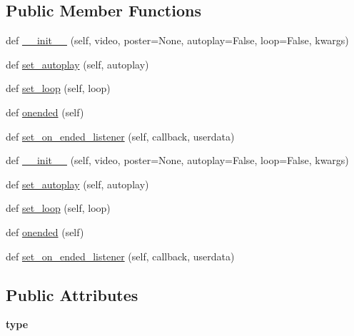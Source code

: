 \subsection*{Public Member Functions}
\begin{DoxyCompactItemize}
\item 
def \hyperlink{classremi_1_1gui_1_1VideoPlayer_a8774671509c23743defcfbf562bbb946}{\+\_\+\+\_\+init\+\_\+\+\_\+} (self, video, poster=None, autoplay=False, loop=False, kwargs)
\item 
def \hyperlink{classremi_1_1gui_1_1VideoPlayer_a762d544c9a502dd9988088ff9341f2aa}{set\+\_\+autoplay} (self, autoplay)
\item 
def \hyperlink{classremi_1_1gui_1_1VideoPlayer_a3c966cee519207e07a5c5dad6883d2c7}{set\+\_\+loop} (self, loop)
\item 
def \hyperlink{classremi_1_1gui_1_1VideoPlayer_a81838f6a1674b811c6d6f28ea59ff766}{onended} (self)
\item 
def \hyperlink{classremi_1_1gui_1_1VideoPlayer_a3da4aff9229c56332ec04663d539ad3b}{set\+\_\+on\+\_\+ended\+\_\+listener} (self, callback, userdata)
\item 
def \hyperlink{classremi_1_1gui_1_1VideoPlayer_a8774671509c23743defcfbf562bbb946}{\+\_\+\+\_\+init\+\_\+\+\_\+} (self, video, poster=None, autoplay=False, loop=False, kwargs)
\item 
def \hyperlink{classremi_1_1gui_1_1VideoPlayer_a762d544c9a502dd9988088ff9341f2aa}{set\+\_\+autoplay} (self, autoplay)
\item 
def \hyperlink{classremi_1_1gui_1_1VideoPlayer_a3c966cee519207e07a5c5dad6883d2c7}{set\+\_\+loop} (self, loop)
\item 
def \hyperlink{classremi_1_1gui_1_1VideoPlayer_a81838f6a1674b811c6d6f28ea59ff766}{onended} (self)
\item 
def \hyperlink{classremi_1_1gui_1_1VideoPlayer_a3da4aff9229c56332ec04663d539ad3b}{set\+\_\+on\+\_\+ended\+\_\+listener} (self, callback, userdata)
\end{DoxyCompactItemize}
\subsection*{Public Attributes}
\begin{DoxyCompactItemize}
\item 
{\bfseries type}\hypertarget{classremi_1_1gui_1_1VideoPlayer_a5711ffd5131ddb84ab0bdbc582882076}{}\label{classremi_1_1gui_1_1VideoPlayer_a5711ffd5131ddb84ab0bdbc582882076}

\end{DoxyCompactItemize}
